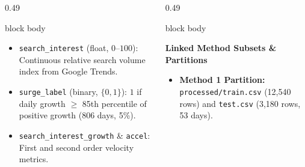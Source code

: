 \documentclass[aspectratio=169, 10pt]{beamer}
\newenvironment{card}[1][]{%
        \begin{beamercolorbox}[rounded=true,shadow=false,wd=\linewidth,sep=3.5pt,#1]{block body}%
        \fontsize{7.8pt}{9.8pt}\selectfont%
    }{%
        \end{beamercolorbox}%
    }
\begin{document}
\begin{frame}[t]
\begin{columns}[T]
\begin{column}{0.49\textwidth}
\begin{card}
\begin{itemize}
                        \item \texttt{search\_interest} (float, $0$--$100$): Continuous relative search volume index from Google Trends.                                                               
                        \item \texttt{surge\_label} (binary, $\{0, 1\}$): $1$ if daily growth $\ge$ 85th percentile of positive growth (806 days, 5\%).                                                       
                        \item \texttt{search\_interest\_growth} \& \texttt{accel}: First and second order velocity metrics.                                                                            
                    \end{itemize}                                                                                                                                                                      
                \end{card}                                                                                                                                                                             
            \end{column}                                                                                                                                                                               
            \begin{column}{0.49\textwidth}                                                                                                                                                             
                \begin{card}                                                                                                                                                                           
                    {\fontsize{7.5pt}{9pt}\selectfont \textbf{\color{BlueAccent}Linked Method Subsets \& Partitions}}\\[0.04cm]                                                                        
                    \begin{itemize}\setlength{\itemsep}{1.5pt}                                                                                                                                         
                        \item \textbf{Method 1 Partition:} \texttt{processed/train.csv} (12,540 rows) and \texttt{test.csv} (3,180 rows, 53 days).                                                     

\end{itemize}
\end{card}
\end{column}
\end{columns}
\end{frame}
\end{document}
